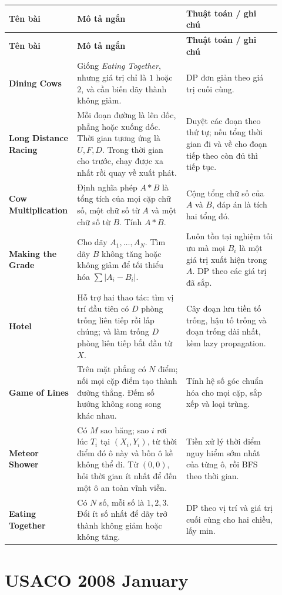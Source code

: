 \documentclass[11pt]{article}
\newenvironment{solutiontable}{%
  \small
  \setlength{\tabcolsep}{4pt}
  \renewcommand{\arraystretch}{1.14}
  \begin{longtable}{L{0.19\linewidth}L{0.39\linewidth}L{0.34\linewidth}}
  \toprule
  \textbf{Tên bài} & \textbf{Mô tả ngắn} & \textbf{Thuật toán / ghi chú}\\
  \midrule
  \endfirsthead
  \toprule
  \textbf{Tên bài} & \textbf{Mô tả ngắn} & \textbf{Thuật toán / ghi chú}\\
  \midrule
  \endhead
}{%
  \bottomrule
  \end{longtable}
  \normalsize
}
\newcommand{\problemrow}[3]{\textbf{#1} & #2 & #3\\\midrule}
\begin{document}
\begin{solutiontable}
\problemrow{Dining Cows}{Giống \emph{Eating Together}, nhưng giá trị chỉ là \(1\) hoặc \(2\), và cần biến dãy thành không giảm.}{DP đơn giản theo giá trị cuối cùng.}
\problemrow{Long Distance Racing}{Mỗi đoạn đường là lên dốc, phẳng hoặc xuống dốc. Thời gian tương ứng là \(U,F,D\). Trong thời gian cho trước, chạy được xa nhất rồi quay về xuất phát.}{Duyệt các đoạn theo thứ tự; nếu tổng thời gian đi và về cho đoạn tiếp theo còn đủ thì tiếp tục.}
\problemrow{Cow Multiplication}{Định nghĩa phép \(A*B\) là tổng tích của mọi cặp chữ số, một chữ số từ \(A\) và một chữ số từ \(B\). Tính \(A*B\).}{Cộng tổng chữ số của \(A\) và \(B\), đáp án là tích hai tổng đó.}
\problemrow{Making the Grade}{Cho dãy \(A_1,\ldots,A_N\). Tìm dãy \(B\) không tăng hoặc không giảm để tối thiểu hóa \(\sum |A_i-B_i|\).}{Luôn tồn tại nghiệm tối ưu mà mọi \(B_i\) là một giá trị xuất hiện trong \(A\). DP theo các giá trị đã sắp.}
\problemrow{Hotel}{Hỗ trợ hai thao tác: tìm vị trí đầu tiên có \(D\) phòng trống liên tiếp rồi lấp chúng; và làm trống \(D\) phòng liên tiếp bắt đầu từ \(X\).}{Cây đoạn lưu tiền tố trống, hậu tố trống và đoạn trống dài nhất, kèm lazy propagation.}
\problemrow{Game of Lines}{Trên mặt phẳng có \(N\) điểm; nối mọi cặp điểm tạo thành đường thẳng. Đếm số hướng không song song khác nhau.}{Tính hệ số góc chuẩn hóa cho mọi cặp, sắp xếp và loại trùng.}
\problemrow{Meteor Shower}{Có \(M\) sao băng; sao \(i\) rơi lúc \(T_i\) tại \((X_i,Y_i)\), từ thời điểm đó ô này và bốn ô kề không thể đi. Từ \((0,0)\), hỏi thời gian ít nhất để đến một ô an toàn vĩnh viễn.}{Tiền xử lý thời điểm nguy hiểm sớm nhất của từng ô, rồi BFS theo thời gian.}
\problemrow{Eating Together}{Có \(N\) số, mỗi số là \(1,2,3\). Đổi ít số nhất để dãy trở thành không giảm hoặc không tăng.}{DP theo vị trí và giá trị cuối cùng cho hai chiều, lấy min.}
\end{solutiontable}

\section{USACO 2008 January}
\end{document}
